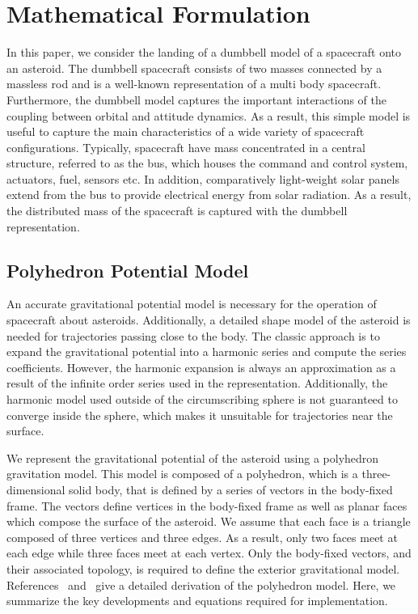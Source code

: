\documentclass[letterpaper, paper,11pt]{AAS}		%
\begin{document}
\section{Mathematical Formulation}\label{se:mathematical_problem}
In this paper, we consider the landing of a dumbbell model of a spacecraft onto an asteroid.
The dumbbell spacecraft consists of two masses connected by a massless rod and is a well-known representation of a multi body spacecraft.
Furthermore, the dumbbell model captures the important interactions of the coupling between orbital and attitude dynamics. 
As a result, this simple model is useful to capture the main characteristics of a wide variety of spacecraft configurations.
Typically, spacecraft have mass concentrated in a central structure, referred to as the bus, which houses the command and control system, actuators, fuel, sensors etc. 
In addition, comparatively light-weight solar panels extend from the bus to provide electrical energy from solar radiation. 
As a result, the distributed mass of the spacecraft is captured with the dumbbell representation.



\subsection{Polyhedron Potential Model}\label{sec:polyhedron_potential}

An accurate gravitational potential model is necessary for the operation of spacecraft about asteroids.
Additionally, a detailed shape model of the asteroid is needed for trajectories passing close to the body.
The classic approach is to expand the gravitational potential into a harmonic series and compute the series coefficients.
However, the harmonic expansion is always an approximation as a result of the infinite order series used in the representation.
Additionally, the harmonic model used outside of the circumscribing sphere is not guaranteed to converge inside the sphere, which makes it unsuitable for trajectories near the surface.

We represent the gravitational potential of the asteroid using a polyhedron gravitation model.
This model is composed of a polyhedron, which is a three-dimensional solid body, that is defined by a series of vectors in the body-fixed frame.
The vectors define vertices in the body-fixed frame as well as planar faces which compose the surface of the asteroid.
We assume that each face is a triangle composed of three vertices and three edges.
As a result, only two faces meet at each edge while three faces meet at each vertex.
Only the body-fixed vectors, and their associated topology, is required to define the exterior gravitational model.
References~ and~ give a detailed derivation of the polyhedron model.
Here, we summarize the key developments and equations required for implementation.
\end{document}
